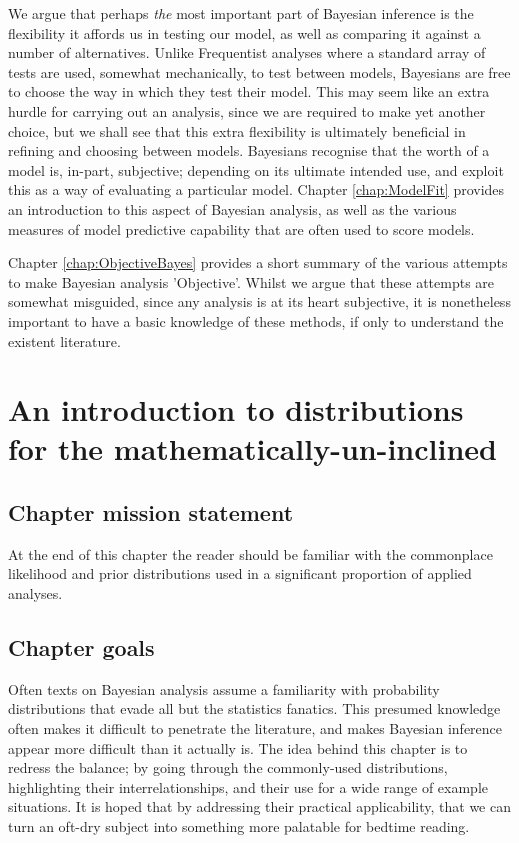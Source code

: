 \documentclass[11pt,fullpage]{book}
\begin{document}
We argue that perhaps \textit{the} most important part of Bayesian inference is the flexibility it affords us in testing our model, as well as comparing it against a number of alternatives. Unlike Frequentist analyses where a standard array of tests are used, somewhat mechanically, to test between models, Bayesians are free to choose the way in which they test their model. This may seem like an extra hurdle for carrying out an analysis, since we are required to make yet another choice, but we shall see that this extra flexibility is ultimately beneficial in refining and choosing between models. Bayesians recognise that the worth of a model is, in-part, subjective; depending on its ultimate intended use, and exploit this as a way of evaluating a particular model. Chapter \ref{chap:ModelFit} provides an introduction to this aspect of Bayesian analysis, as well as the various measures of model predictive capability that are often used to score models.

Chapter \ref{chap:ObjectiveBayes} provides a short summary of the various attempts to make Bayesian analysis 'Objective'. Whilst we argue that these attempts are somewhat misguided, since any analysis is at its heart subjective, it is nonetheless important to have a basic knowledge of these methods, if only to understand the existent literature.


\chapter{An introduction to distributions for the mathematically-un-inclined}\label{chap:distributions}
\section{Chapter mission statement}
At the end of this chapter the reader should be familiar with the commonplace likelihood and prior distributions used in a significant proportion of applied analyses.

\section{Chapter goals}
Often texts on Bayesian analysis assume a familiarity with probability distributions that evade all but the statistics fanatics. This presumed knowledge often makes it difficult to penetrate the literature, and makes Bayesian inference appear more difficult than it actually is. The idea behind this chapter is to redress the balance; by going through the commonly-used distributions, highlighting their interrelationships, and their use for a wide range of example situations. It is hoped that by addressing their practical applicability, that we can turn an oft-dry subject into something more palatable for bedtime reading.
\end{document}
